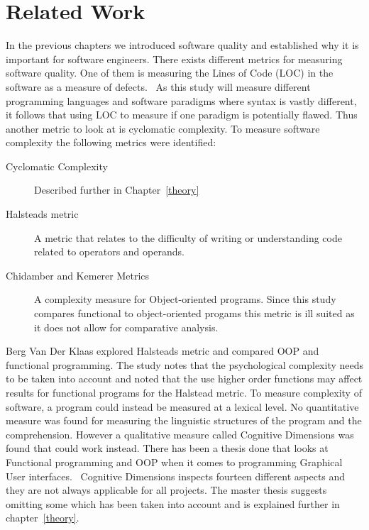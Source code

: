\chapter{Related Work}\label{relatedwork}

In the previous chapters we introduced software quality and established why it
is important for software engineers. There exists different metrics for
measuring software quality. One of them is measuring the Lines of Code (LOC) in
the software as a measure of defects.~\cite{defectloc} As this study will
measure different programming languages and software paradigms where syntax is
vastly different, it follows that using LOC to measure if one paradigm is
potentially flawed. Thus another metric to look at is cyclomatic complexity. To
measure software complexity the following metrics were identified:

\begin{description}

    \item [Cyclomatic Complexity] Described further in Chapter~\ref{theory}

    \item [Halsteads metric] A metric that relates to the difficulty of writing
    or understanding code related to operators and operands.~\cite{bergklaas}

    \item [Chidamber and Kemerer Metrics~\cite{chidamber}] A complexity measure
    for Object-oriented programs. Since this study compares functional to
    object-oriented progams this metric is ill suited as it does not allow for
    comparative analysis.

\end{description}

Berg Van Der Klaas explored Halsteads metric and compared OOP and functional
programming. The study notes that the psychological complexity needs to be taken
into account and noted that the use higher order functions may affect results
for functional programs for the Halstead metric. To measure complexity of
software, a program could instead be measured at a lexical level. No
quantitative measure was found for measuring the linguistic structures of the
program and the comprehension. However a qualitative measure called Cognitive
Dimensions was found that could work instead. There has been a thesis done that
looks at Functional programming and OOP when it comes to programming Graphical
User interfaces.~\cite{euguenkiss} Cognitive Dimensions inspects
fourteen different aspects and they are not always applicable for all projects.
The master thesis suggests omitting some which has been taken into account and
is explained further in chapter~\ref{theory}.
